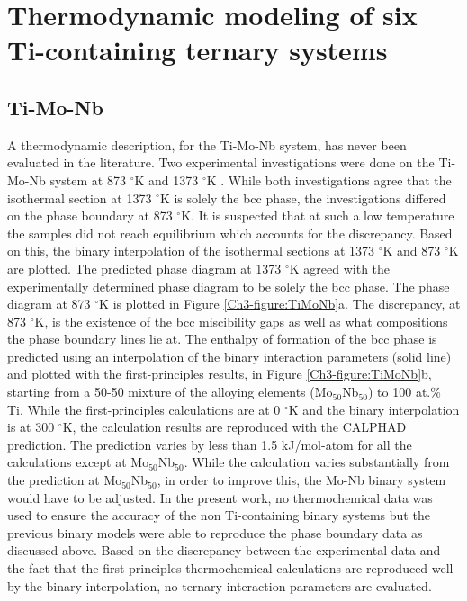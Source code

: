 \section{Thermodynamic modeling of six Ti-containing ternary systems}

\subsection{Ti-Mo-Nb}

A thermodynamic description, for the Ti-Mo-Nb system, has never been evaluated in the literature. Two experimental investigations were done on the Ti-Mo-Nb system at 873 $^{\circ}$K and 1373 $^{\circ}$K \cite{English1961,Prokoshkin1967}. While both investigations agree that the isothermal section at 1373 $^{\circ}$K is solely the bcc phase, the investigations differed on the phase boundary at 873 $^{\circ}$K. It is suspected that at such a low temperature the samples did not reach equilibrium which accounts for the discrepancy. Based on this, the binary interpolation of the isothermal sections at 1373 $^{\circ}$K and 873 $^{\circ}$K are plotted. The predicted phase diagram at 1373 $^{\circ}$K agreed with the experimentally determined phase diagram to be solely the bcc phase. The phase diagram at 873 $^{\circ}$K is plotted in Figure \ref{Ch3-figure:TiMoNb}a. The discrepancy, at 873 $^{\circ}$K, is the existence of the bcc miscibility gaps as well as what compositions the phase boundary lines lie at. The enthalpy of formation of the bcc phase is predicted using an interpolation of the binary interaction parameters (solid line) and plotted with the first-principles results, in Figure \ref{Ch3-figure:TiMoNb}b, starting from a 50-50 mixture of the alloying elements (Mo$_{50}$Nb$_{50}$) to 100 at.\% Ti. While the first-principles calculations are at 0 $^{\circ}$K and the binary interpolation is at 300 $^{\circ}$K, the calculation results are reproduced with the CALPHAD prediction. The prediction varies by less than 1.5 kJ/mol-atom for all the calculations except at Mo$_{50}$Nb$_{50}$. While the calculation varies substantially from the prediction at Mo$_{50}$Nb$_{50}$, in order to improve this, the Mo-Nb binary system would have to be adjusted. In the present work, no thermochemical data was used to ensure the accuracy of the non Ti-containing binary systems but the previous binary models were able to reproduce the phase boundary data as discussed above. Based on the discrepancy between the experimental data and the fact that the first-principles thermochemical calculations are reproduced well by the binary interpolation, no ternary interaction parameters are evaluated. 



